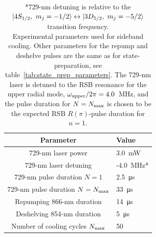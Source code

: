     \begin{table}
        \begin{center}
        \begin{tabular}{|c|l|}
            \hline
            Parameter & Value \\
            \hline
            729-nm laser power & 3.0~\unit{\mW}\\
            729-nm laser detuning & -4.0~\unit{\MHz}*\\
            729-nm pulse duration $N = 1$ & 2.5~\unit{\us}\\
            729-nm pulse duration $N = N_{\rm max}$ & 33~\unit{\us}  \\
            Repumping 866-nm duration & 14~\unit{\us}\\
            Deshelving 854-nm duration & 5~\unit{\us}\\
            Number of cooling cycles $N_{\rm max}$ & 50\\
            \hline
        \end{tabular}
        \end{center}
        \caption{
            *729-nm detuning is relative to the $\ket{4S_{1/2},~m_j=-1/2} \leftrightarrow \ket{3D_{5/2},~m_j=-5/2}$ transition frequency.\\
            Experimental parameters used for sideband cooling. Other parameters for the repump and deshelve pulses are the same as for state-preparation, see table~\ref{tab:state_prep_parameters}. The 729-nm laser is detuned to the RSB resonance for the upper radial mode, $\omega_{\rm upper}/2\pi = 4.0$~\unit{\MHz}, and the pulse duration for $N=N_{\rm max}$ is chosen to be the expected RSB $R(\pi)$-pulse duration for $n=1$. 
            }
        \label{tab:sbc_parameters}
    \end{table}

